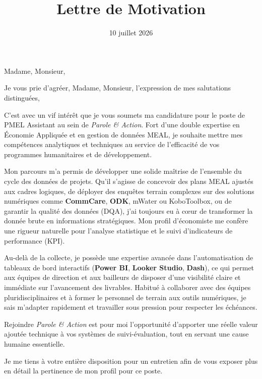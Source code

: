 \documentclass[11pt,a4paper,sans]{moderncv}
\title{Lettre de Motivation}
\begin{document}
\date{10 juillet 2026}
\opening{Madame, Monsieur,}
\closing{Je vous prie d'agréer, Madame, Monsieur, l'expression de mes salutations distinguées,}

\makelettertitle

C'est avec un vif intérêt que je vous soumets ma candidature pour le poste de PMEL Assistant au sein de \textit{Parole \& Action}. Fort d'une double expertise en Économie Appliquée et en gestion de données MEAL, je souhaite mettre mes compétences analytiques et techniques au service de l'efficacité de vos programmes humanitaires et de développement.

Mon parcours m'a permis de développer une solide maîtrise de l'ensemble du cycle des données de projets. Qu'il s'agisse de concevoir des plans MEAL ajustés aux cadres logiques, de déployer des enquêtes terrain complexes sur des solutions numériques comme \textbf{CommCare}, \textbf{ODK}, mWater ou KoboToolbox, ou de garantir la qualité des données (DQA), j'ai toujours eu à cœur de transformer la donnée brute en informations stratégiques. Mon profil d'économiste me confère une rigueur naturelle pour l'analyse statistique et le suivi d'indicateurs de performance (KPI).

Au-delà de la collecte, je possède une expertise avancée dans l'automatisation de tableaux de bord interactifs (\textbf{Power BI}, \textbf{Looker Studio}, \textbf{Dash}), ce qui permet aux équipes de direction et aux bailleurs de disposer d'une visibilité claire et immédiate sur l'avancement des livrables. Habitué à collaborer avec des équipes pluridisciplinaires et à former le personnel de terrain aux outils numériques, je sais m'adapter rapidement et travailler sous pression pour respecter les échéances.

Rejoindre \textit{Parole \& Action} est pour moi l'opportunité d'apporter une réelle valeur ajoutée technique à vos systèmes de suivi-évaluation, tout en servant une cause humaine essentielle.

Je me tiens à votre entière disposition pour un entretien afin de vous exposer plus en détail la pertinence de mon profil pour ce poste.

\makeletterclosing
\end{document}
